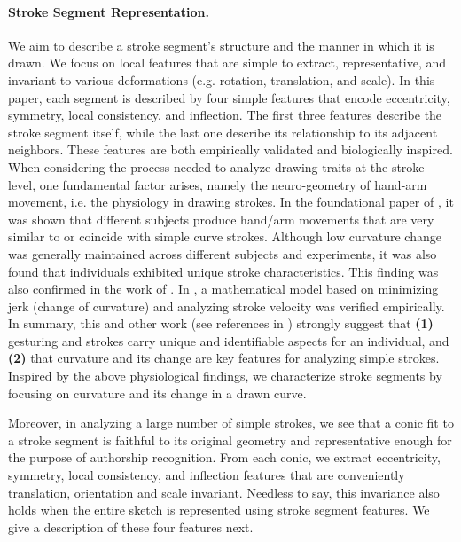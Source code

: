 \paragraph{Stroke Segment Representation.} We aim to describe a stroke segment's structure and the manner in which it is drawn. We focus on local features that are simple to extract, representative, and invariant to various deformations (e.g. rotation, translation, and scale). In this paper, each segment is described by four simple features that encode eccentricity, symmetry, local consistency, and inflection. The first three features describe the stroke segment itself, while the last one describe its relationship to its adjacent neighbors. These features are both empirically validated and biologically inspired. When considering the process needed to analyze drawing traits at the stroke level, one fundamental factor arises, namely the neuro-geometry of hand-arm movement, i.e. the physiology in drawing strokes. In the foundational paper of  \cite{morasso1981spatial}, it was shown that different subjects produce hand/arm movements that are very similar to or coincide with simple curve strokes. Although low curvature change was generally maintained across different subjects and experiments, it was also found that individuals exhibited unique stroke characteristics. This finding was also confirmed in the work of  \cite{abend1982human}. In \cite{flash1985coordination}, a mathematical model based on minimizing jerk (change of curvature) and analyzing stroke velocity was verified empirically. In summary, this and other work (see references in \cite{flash1985coordination}) strongly suggest that \textbf{(1)} gesturing and strokes carry unique and identifiable aspects for an individual, and \textbf{(2)} that curvature and its change are key features for analyzing simple strokes. Inspired by the above physiological findings, we characterize stroke segments by focusing on curvature and its change in a drawn curve.

Moreover, in analyzing a large number of simple strokes, we see that a conic fit to a stroke segment is faithful to its original geometry and representative enough for the purpose of authorship recognition. From each conic, we extract eccentricity, symmetry, local consistency, and inflection features that are conveniently translation, orientation and scale invariant. Needless to say, this invariance also holds when the entire sketch is represented using stroke segment features. We give a description of these four features next.





